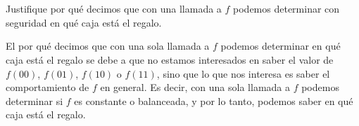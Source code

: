 \documentclass[./../main.tex]{subfiles}
\begin{document}

\section{}

Justifique por qué decimos que con una llamada a \(f\) podemos determinar con seguridad en qué caja está el regalo.

\startsolution

El por qué decimos que con una sola llamada a \(f\) podemos determinar en qué caja está el regalo se debe a que no estamos interesados en saber el valor de \(f(00)\), \(f(01)\), \(f(10)\) o \(f(11)\), sino que lo que nos interesa es saber el comportamiento de \(f\) en general. Es decir, con una sola llamada a \(f\) podemos determinar si \(f\) es constante o balanceada, y por lo tanto, podemos saber en qué caja está el regalo.
\end{document}
